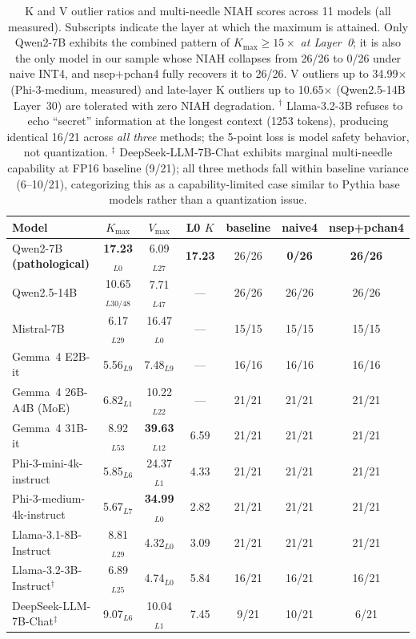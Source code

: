 \documentclass[11pt]{article}
\begin{document}
\begin{table}[h]
\centering
\small
\begin{tabular}{lcccccc}
\toprule
Model & $K_{\max}$ & $V_{\max}$ & L0 $K$ & baseline & naive4 & nsep+pchan4 \\
\midrule
Qwen2-7B \textbf{(pathological)} & \textbf{17.23}$_{L0}$ & 6.09$_{L27}$ & \textbf{17.23} & 26/26 & \textbf{0/26} & \textbf{26/26} \\
\midrule
Qwen2.5-14B & 10.65$_{L30/48}$ & 7.71$_{L47}$ & --- & 26/26 & 26/26 & 26/26 \\
Mistral-7B & 6.17$_{L29}$ & 16.47$_{L0}$ & --- & 15/15 & 15/15 & 15/15 \\
Gemma~4 E2B-it & 5.56$_{L9}$ & 7.48$_{L9}$ & --- & 16/16 & 16/16 & 16/16 \\
Gemma~4 26B-A4B (MoE) & 6.82$_{L1}$ & 10.22$_{L22}$ & --- & 21/21 & 21/21 & 21/21 \\
Gemma~4 31B-it & 8.92$_{L53}$ & \textbf{39.63}$_{L12}$ & 6.59 & 21/21 & 21/21 & 21/21 \\
Phi-3-mini-4k-instruct & 5.85$_{L6}$ & 24.37$_{L1}$ & 4.33 & 21/21 & 21/21 & 21/21 \\
Phi-3-medium-4k-instruct & 5.67$_{L7}$ & \textbf{34.99}$_{L0}$ & 2.82 & 21/21 & 21/21 & 21/21 \\
Llama-3.1-8B-Instruct & 8.81$_{L29}$ & 4.32$_{L0}$ & 3.09 & 21/21 & 21/21 & 21/21 \\
Llama-3.2-3B-Instruct$^{\dagger}$ & 6.89$_{L25}$ & 4.74$_{L0}$ & 5.84 & 16/21 & 16/21 & 16/21 \\
DeepSeek-LLM-7B-Chat$^{\ddagger}$ & 9.07$_{L6}$ & 10.04$_{L1}$ & 7.45 & 9/21 & 10/21 & 6/21 \\
\bottomrule
\end{tabular}
\caption{K and V outlier ratios and multi-needle NIAH scores across 11 models (all measured). Subscripts indicate the layer at which the maximum is attained. Only Qwen2-7B exhibits the combined pattern of $K_{\max} \ge 15\times$ \emph{at Layer~0}; it is also the only model in our sample whose NIAH collapses from 26/26 to 0/26 under naive INT4, and nsep+pchan4 fully recovers it to 26/26. V outliers up to 34.99$\times$ (Phi-3-medium, measured) and late-layer K outliers up to 10.65$\times$ (Qwen2.5-14B Layer~30) are tolerated with zero NIAH degradation. $^{\dagger}$ Llama-3.2-3B refuses to echo ``secret'' information at the longest context (1253 tokens), producing identical 16/21 across \emph{all three} methods; the 5-point loss is model safety behavior, not quantization. $^{\ddagger}$ DeepSeek-LLM-7B-Chat exhibits marginal multi-needle capability at FP16 baseline (9/21); all three methods fall within baseline variance (6--10/21), categorizing this as a capability-limited case similar to Pythia base models rather than a quantization issue.}
\label{tab:kv_asymmetry}
\end{table}
\end{document}
